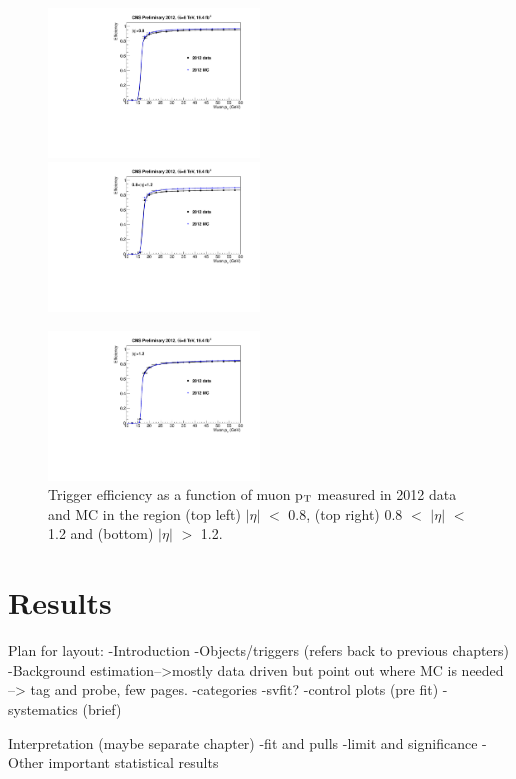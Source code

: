 \begin{figure}[h!]
\includegraphics[width=0.5\textwidth]{plots/TagAndProbe/MuonAbsEta082012DatavsMC.pdf}
\includegraphics[width=0.5\textwidth]{plots/TagAndProbe/MuonAbsEta122012DatavsMC.pdf}
\begin{center}
\includegraphics[width=0.5\textwidth]{plots/TagAndProbe/MuonAbsEndcap2012DatavsMC.pdf}
\end{center}
\caption{Trigger efficiency as a function of muon p$_{\rm{T}}$ measured in
2012 data and MC in the region (top left) $|\eta|$ $<$ 0.8, (top right) 0.8
$<$ $|\eta|$ $<$ 1.2 and (bottom) $|\eta|$ $>$ 1.2.}
\label{fig:muontrg}
\end{figure}



\section{Results}

Plan for layout:
-Introduction
-Objects/triggers (refers back to previous chapters)
-Background estimation-->mostly data driven but point out where MC is needed -->
tag and probe, few pages.
-categories
-svfit?
-control plots (pre fit)
-systematics (brief)

Interpretation (maybe separate chapter)
-fit and pulls
-limit and significance
-Other important statistical results
